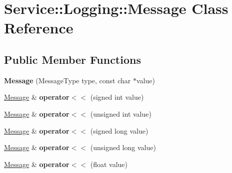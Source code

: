 \hypertarget{classService_1_1Logging_1_1Message}{}\section{Service\+:\+:Logging\+:\+:Message Class Reference}
\label{classService_1_1Logging_1_1Message}
\subsection*{Public Member Functions}
\begin{DoxyCompactItemize}
\item 
\mbox{\label{classService_1_1Logging_1_1Message_a291ff3f65ab31443dde92895892a376b}} 
{\bfseries Message} (Message\+Type type, const char $\ast$value)
\item 
\mbox{\label{classService_1_1Logging_1_1Message_a5744d537b045b92fc6181e5bdd62b3ac}} 
\mbox{\hyperlink{classService_1_1Logging_1_1Message}{Message}} \& {\bfseries operator$<$$<$} (signed int value)
\item 
\mbox{\label{classService_1_1Logging_1_1Message_abd6dce840cbadbb71cddac0ab70f95da}} 
\mbox{\hyperlink{classService_1_1Logging_1_1Message}{Message}} \& {\bfseries operator$<$$<$} (unsigned int value)
\item 
\mbox{\label{classService_1_1Logging_1_1Message_ab04e0b0839179c0b9da720b81b10c123}} 
\mbox{\hyperlink{classService_1_1Logging_1_1Message}{Message}} \& {\bfseries operator$<$$<$} (signed long value)
\item 
\mbox{\label{classService_1_1Logging_1_1Message_a5824e979f1bde8a492db0b08e8742bf8}} 
\mbox{\hyperlink{classService_1_1Logging_1_1Message}{Message}} \& {\bfseries operator$<$$<$} (unsigned long value)
\item 
\mbox{\label{classService_1_1Logging_1_1Message_ab739b2ab788cd626846b25967dc4b499}} 
\mbox{\hyperlink{classService_1_1Logging_1_1Message}{Message}} \& {\bfseries operator$<$$<$} (float value)
\item 

\end{DoxyCompactItemize}
